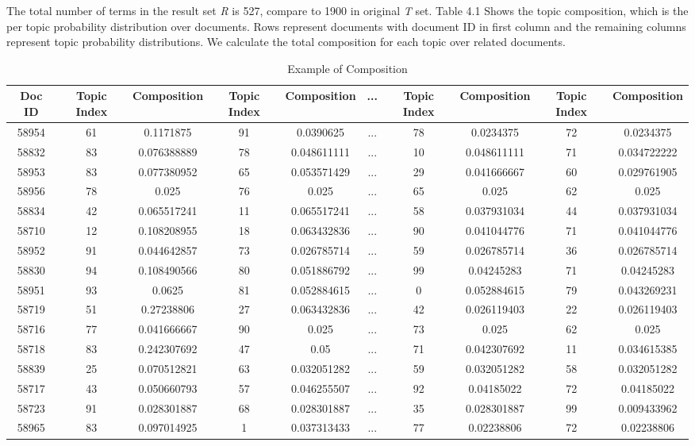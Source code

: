 \documentclass[11pt,twoside]{report}
\begin{document}
The total number of terms in the result set \textit{R} is 527, compare to 1900 in original \textit{T} set.
Table 4.1 Shows the topic composition, which is the per topic probability distribution over documents. Rows represent documents with document ID in first column and the remaining columns represent topic probability distributions. 
We calculate the total composition for each topic over related documents.\\
\begin{table}[ht]
\tiny
\caption{Example of Composition}
\centering
\begin{tabular}{| c | c | c | c | c | c | c | c | c | c |}
\hline\hline
Doc ID & Topic Index & Composition & Topic Index & Composition & ... & Topic Index & Composition & Topic Index & Composition\\
\hline
58954 & 61 & 0.1171875 & 91 & 0.0390625 &...& 78 & 0.0234375 & 72 & 0.0234375\\
\hline
58832 & 83 & 0.076388889 & 78 & 0.048611111 &...& 10 & 0.048611111 & 71 & 0.034722222\\
\hline
58953 & 83 & 0.077380952 & 65 & 0.053571429 &...& 29 & 0.041666667 & 60 & 0.029761905\\
\hline
58956 & 78 & 0.025 & 76 & 0.025 &...& 65 & 0.025 & 62 & 0.025\\
\hline
58834 & 42 & 0.065517241 & 11 & 0.065517241 &...& 58 & 0.037931034 & 44 & 0.037931034\\
\hline
58710 & 12 & 0.108208955 & 18 & 0.063432836 &...& 90 & 0.041044776 & 71 & 0.041044776\\
\hline
58952 & 91 & 0.044642857 & 73 & 0.026785714 &...& 59 & 0.026785714 & 36 & 0.026785714\\
\hline
58830 & 94 & 0.108490566 & 80 & 0.051886792 &...& 99 & 0.04245283 & 71 & 0.04245283\\
\hline
58951 & 93 & 0.0625 & 81 & 0.052884615 &...& 0 & 0.052884615 & 79 & 0.043269231\\
\hline
58719 & 51 & 0.27238806 & 27 & 0.063432836 &...& 42 & 0.026119403 & 22 & 0.026119403\\
\hline
58716 & 77 & 0.041666667 & 90 & 0.025 &...& 73 & 0.025 & 62 & 0.025\\
\hline
58718 & 83 & 0.242307692 & 47 & 0.05 &...& 71 & 0.042307692 & 11 & 0.034615385\\
\hline
58839 & 25 & 0.070512821 & 63 & 0.032051282 &...& 59 & 0.032051282 & 58 & 0.032051282\\
\hline
58717 & 43 & 0.050660793 & 57 & 0.046255507 &...& 92 & 0.04185022 & 72 & 0.04185022\\
\hline
58723 & 91 & 0.028301887 & 68 & 0.028301887 &...& 35 & 0.028301887 & 99 & 0.009433962\\
\hline
58965 & 83 & 0.097014925 & 1 & 0.037313433 &...& 77 & 0.02238806 & 72 & 0.02238806\\
\hline
\end{tabular}
\label{table:Example of Composition}
\end{table}
\end{document}
